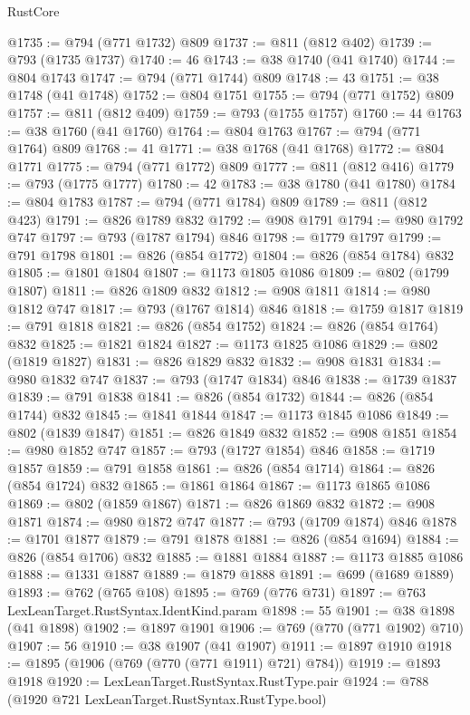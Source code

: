 \begin{lexlean}{RustCore}
\begin{coremodule}
@1735 := @794 (@771 @1732) @809
@1737 := @811 (@812 @402)
@1739 := @793 (@1735 @1737)
@1740 := 46
@1743 := @38 @1740 (@41 @1740)
@1744 := @804 @1743
@1747 := @794 (@771 @1744) @809
@1748 := 43
@1751 := @38 @1748 (@41 @1748)
@1752 := @804 @1751
@1755 := @794 (@771 @1752) @809
@1757 := @811 (@812 @409)
@1759 := @793 (@1755 @1757)
@1760 := 44
@1763 := @38 @1760 (@41 @1760)
@1764 := @804 @1763
@1767 := @794 (@771 @1764) @809
@1768 := 41
@1771 := @38 @1768 (@41 @1768)
@1772 := @804 @1771
@1775 := @794 (@771 @1772) @809
@1777 := @811 (@812 @416)
@1779 := @793 (@1775 @1777)
@1780 := 42
@1783 := @38 @1780 (@41 @1780)
@1784 := @804 @1783
@1787 := @794 (@771 @1784) @809
@1789 := @811 (@812 @423)
@1791 := @826 @1789 @832
@1792 := @908 @1791
@1794 := @980 @1792 @747
@1797 := @793 (@1787 @1794) @846
@1798 := @1779 @1797
@1799 := @791 @1798
@1801 := @826 (@854 @1772)
@1804 := @826 (@854 @1784) @832
@1805 := @1801 @1804
@1807 := @1173 @1805 @1086
@1809 := @802 (@1799 @1807)
@1811 := @826 @1809 @832
@1812 := @908 @1811
@1814 := @980 @1812 @747
@1817 := @793 (@1767 @1814) @846
@1818 := @1759 @1817
@1819 := @791 @1818
@1821 := @826 (@854 @1752)
@1824 := @826 (@854 @1764) @832
@1825 := @1821 @1824
@1827 := @1173 @1825 @1086
@1829 := @802 (@1819 @1827)
@1831 := @826 @1829 @832
@1832 := @908 @1831
@1834 := @980 @1832 @747
@1837 := @793 (@1747 @1834) @846
@1838 := @1739 @1837
@1839 := @791 @1838
@1841 := @826 (@854 @1732)
@1844 := @826 (@854 @1744) @832
@1845 := @1841 @1844
@1847 := @1173 @1845 @1086
@1849 := @802 (@1839 @1847)
@1851 := @826 @1849 @832
@1852 := @908 @1851
@1854 := @980 @1852 @747
@1857 := @793 (@1727 @1854) @846
@1858 := @1719 @1857
@1859 := @791 @1858
@1861 := @826 (@854 @1714)
@1864 := @826 (@854 @1724) @832
@1865 := @1861 @1864
@1867 := @1173 @1865 @1086
@1869 := @802 (@1859 @1867)
@1871 := @826 @1869 @832
@1872 := @908 @1871
@1874 := @980 @1872 @747
@1877 := @793 (@1709 @1874) @846
@1878 := @1701 @1877
@1879 := @791 @1878
@1881 := @826 (@854 @1694)
@1884 := @826 (@854 @1706) @832
@1885 := @1881 @1884
@1887 := @1173 @1885 @1086
@1888 := @1331 @1887
@1889 := @1879 @1888
@1891 := @699 (@1689 @1889)
@1893 := @762 (@765 @108)
@1895 := @769 (@776 @731)
@1897 := @763 LexLeanTarget.RustSyntax.IdentKind.param
@1898 := 55
@1901 := @38 @1898 (@41 @1898)
@1902 := @1897 @1901
@1906 := @769 (@770 (@771 @1902) @710)
@1907 := 56
@1910 := @38 @1907 (@41 @1907)
@1911 := @1897 @1910
@1918 := @1895 (@1906 (@769 (@770 (@771 @1911) @721) @784))
@1919 := @1893 @1918
@1920 := LexLeanTarget.RustSyntax.RustType.pair
@1924 := @788 (@1920 @721 LexLeanTarget.RustSyntax.RustType.bool)

\end{coremodule}
\end{lexlean}
